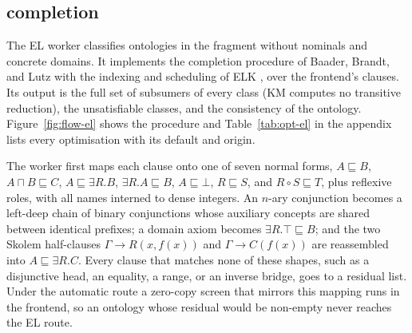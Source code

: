 \subsection{\EL{} completion}
\label{sec:elc}

The EL worker classifies ontologies in the \EL{} fragment without nominals and
concrete domains.  It implements the completion procedure of Baader, Brandt,
and Lutz \cite{baader2005el} with the indexing and scheduling of ELK
\cite{kazakov2011concurrent,kazakov2014elk}, over the frontend's clauses.  Its
output is the full set of subsumers of every class (KM computes no transitive
reduction), the unsatisfiable classes, and the consistency of the ontology.
Figure~\ref{fig:flow-el} shows the procedure and
Table~\ref{tab:opt-el} in the appendix lists every optimisation with its
default and origin.

The worker first maps each clause onto one of seven normal forms,
$A\sqsubseteq B$, $A\sqcap B\sqsubseteq C$, $A\sqsubseteq\exists R.B$,
$\exists R.A\sqsubseteq B$, $A\sqsubseteq\bot$, $R\sqsubseteq S$, and
$R\circ S\sqsubseteq T$, plus reflexive roles, with all names interned to dense
integers.  An $n$-ary conjunction becomes a left-deep chain of binary
conjunctions whose auxiliary concepts are shared between identical prefixes; a
domain axiom becomes $\exists R.\top\sqsubseteq B$; and the two Skolem
half-clauses $\Gamma\rightarrow R(x,f(x))$ and $\Gamma\rightarrow C(f(x))$ are
reassembled into $A\sqsubseteq\exists R.C$.  Every clause that matches none of
these shapes, such as a disjunctive head, an equality, a range, or an inverse
bridge, goes to a residual list.  Under the automatic route a zero-copy screen
that mirrors this mapping runs in the frontend, so an ontology whose residual
would be non-empty never reaches the EL route.

